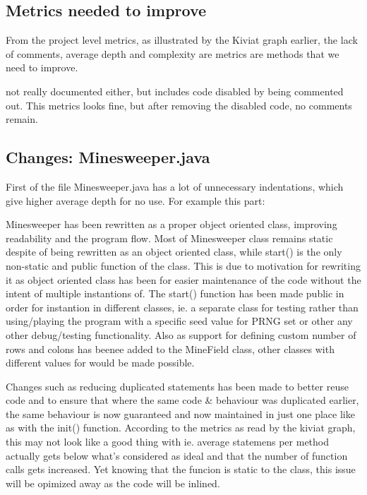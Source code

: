 \documentclass[UKenglish]{article}  %
\begin{document}
\subsection{Metrics needed to improve}
From the project level metrics, as illustrated by the Kiviat graph earlier,
the lack of comments, average depth and complexity are metrics are methods
that we need to improve.

 not really documented either, but includes code disabled by being
commented out. This metrics looks fine, but after removing the disabled code, no
comments remain.

\subsection{Changes: Minesweeper.java} First of the file Minesweeper.java has a
lot of unnecessary indentations, which give higher average depth for no use. For
example this part:

Minesweeper has been rewritten as a proper object oriented class, improving
readability and the program flow.
Most of Minesweeper class remains static despite of being rewritten
as an object oriented class, while start() is the only non-static and public
function of the class. This is due to motivation for rewriting it as object
oriented class has been for easier maintenance of the code without the intent
of multiple instantions of. The start() function has been made public in order
for instantion in different classes, ie. a separate class for testing rather
than using/playing the program with a specific seed value for PRNG set or
other any other debug/testing functionality.
Also as support for defining custom number of rows and colons has beenee added
to the MineField class, other classes with different values for would be
made possible.

Changes such as reducing duplicated statements has been made to better reuse
code and to ensure that where the same code \& behaviour was duplicated earlier,
the same behaviour is now guaranteed and now maintained in just one place like
as with the init() function. According to the metrics as read by the kiviat
graph, this may not look like a good thing with ie. average statemens per
method actually gets below what's considered as ideal and that the number of
function calls gets increased. Yet knowing that the funcion is static to the
class, this issue will be opimized away as the code will be inlined.
\end{document}
